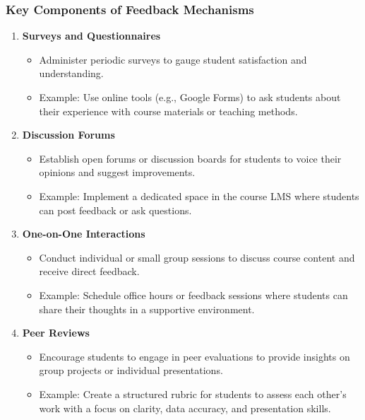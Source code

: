 \documentclass[aspectratio=169]{beamer}
\begin{document}
\begin{frame}[fragile]
    \frametitle{Key Components of Feedback Mechanisms}
    \begin{enumerate}
        \item \textbf{Surveys and Questionnaires}
            \begin{itemize}
                \item Administer periodic surveys to gauge student satisfaction and understanding.
                \item Example: Use online tools (e.g., Google Forms) to ask students about their experience with course materials or teaching methods.
            \end{itemize}
        \item \textbf{Discussion Forums}
            \begin{itemize}
                \item Establish open forums or discussion boards for students to voice their opinions and suggest improvements.
                \item Example: Implement a dedicated space in the course LMS where students can post feedback or ask questions.
            \end{itemize}
        \item \textbf{One-on-One Interactions}
            \begin{itemize}
                \item Conduct individual or small group sessions to discuss course content and receive direct feedback.
                \item Example: Schedule office hours or feedback sessions where students can share their thoughts in a supportive environment.
            \end{itemize}
        \item \textbf{Peer Reviews}
            \begin{itemize}
                \item Encourage students to engage in peer evaluations to provide insights on group projects or individual presentations.
                \item Example: Create a structured rubric for students to assess each other's work with a focus on clarity, data accuracy, and presentation skills.
            \end{itemize}
    \end{enumerate}
\end{frame}
\end{document}
